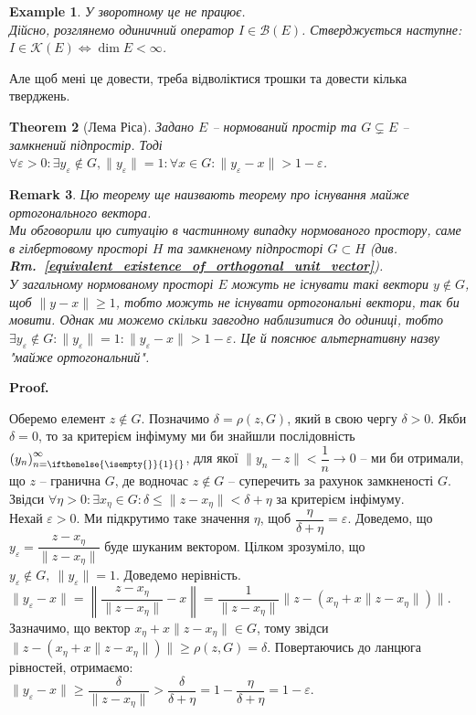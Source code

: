 \documentclass[a4paper, 10pt]{article}
\makeatletter
\theoremstyle{theoremdd}
\newtheorem{theorem}{Theorem}[subsection]
\theoremstyle{theoremdd}
\theoremstyle{theoremdd}
\theoremstyle{theoremdd}
\newtheorem{example}[theorem]{Example}
\theoremstyle{theoremdd}
\theoremstyle{theoremdd}
\newtheorem{remark}[theorem]{Remark}
\theoremstyle{theoremdd}
\theoremstyle{theoremdd}
\newcommand\rmref[1]{\textbf{Rm.~\ref{#1}}}
\newcommand{\sequence}[2][]{\left({#2}\right)_{n=\ifthenelse{\isempty{#1}}{1}{#1}}^{\infty}}
\renewenvironment{proof}[1][Proof.\\]{\par
\pushQED{\hfill \qed}%
\normalfont \topsep6\p@\@plus6\p@\relax
\trivlist
\item\relax
{\bfseries
#1\@addpunct{.}}\hspace\labelsep\ignorespaces
}{%
\popQED\endtrivlist\@endpefalse
}
\makeatother
\begin{document}
\begin{example}
У зворотному це не працює.\\
Дійсно, розглянемо одиничний оператор $I \in \mathcal{B}(E)$. Стверджується наступне:\\
$I \in \mathcal{K}(E) \iff \dim E < \infty$.
\end{example}
\noindent
Але щоб мені це довести, треба відволіктися трошки та довести кілька тверджень.

\begin{theorem}[Лема Ріса]
Задано $E$ -- нормований простір та $G \subsetneq E$ -- замкнений підпростір. Тоді $\forall \varepsilon > 0: \exists y_\varepsilon \notin G, \|y_\varepsilon\| = 1: \forall x \in G: \|y_\varepsilon - x\| > 1-\varepsilon$.
\end{theorem}

\begin{remark}
Цю теорему ще наизвають теорему про існування майже ортогонального вектора.\\
Ми обговорили цю ситуацію в частинному випадку нормованого простору, саме в гілбертовому просторі $H$ та замкненому підпросторі $G \subset H$ (див. \rmref{equivalent_existence_of_orthogonal_unit_vector}).\\
У загальному нормованому просторі $E$ можуть не існувати такі вектори $y \notin G$, щоб $\|y - x\| \geq 1$, тобто можуть не існувати ортогональні вектори, так би мовити. Однак ми можемо скільки завгодно наблизитися до одиниці, тобто $\exists y_\varepsilon \notin G: \|y_\varepsilon\| = 1: \|y_\varepsilon - x\| > 1-\varepsilon$. Це й пояснює альтернативну назву "майже ортогональний".
\end{remark}

\begin{proof}
Оберемо елемент $z \notin G$. Позначимо $\delta = \rho(z,G)$, який в свою чергу $\delta > 0$. Якби $\delta = 0$, то за критерієм інфімуму ми би знайшли послідовність $\sequence{y_n}$, для якої $\|y_n - z \| < \dfrac{1}{n} \to 0$ -- ми би отримали, що $z$ -- гранична $G$, де водночас $z \notin G$ -- суперечить за рахунок замкненості $G$.\\
Звідси $\forall \eta > 0: \exists x_\eta \in G: \delta \leq \|z - x_\eta\| < \delta + \eta$ за критерієм інфімуму.\\
Нехай $\varepsilon > 0$. Ми підкрутимо таке значення $\eta$, щоб $\dfrac{\eta}{\delta + \eta} = \varepsilon$. Доведемо, що $y_\varepsilon = \dfrac{z-x_\eta}{\|z - x_\eta \|}$ буде шуканим вектором. Цілком зрозуміло, що $y_\varepsilon \notin G,\ \|y_\varepsilon\| = 1$. Доведемо нерівність.\\
$\|y_\varepsilon - x\| = \left\| \dfrac{z-x_\eta}{\|z - x_\eta \|} - x \right\| = \dfrac{1}{\|z- x_\eta\|} \| z - (x_\eta + x \|z-x_\eta\|) \|$.\\
Зазначимо, що вектор $x_\eta + x \|z-x_\eta\| \in G$, тому звідси $\|z - (x_\eta + x \|z-x_\eta\|) \| \geq \rho(z,G) = \delta$. Повертаючись до ланцюга рівностей, отримаємо:\\
$\|y_\varepsilon - x\| \geq \dfrac{\delta}{\|z - x_\eta\|} > \dfrac{\delta}{\delta + \eta} = 1 - \dfrac{\eta}{\delta + \eta} = 1- \varepsilon$.
\end{proof}
\end{document}

